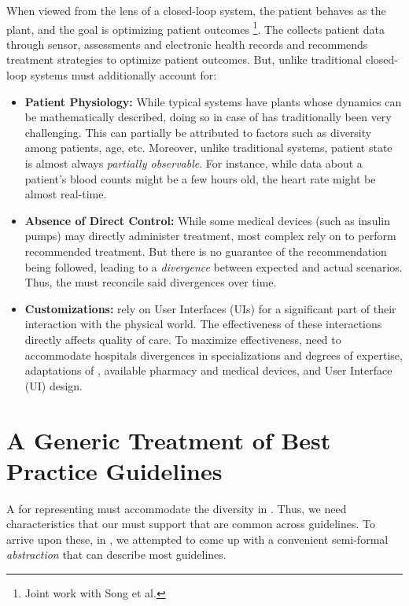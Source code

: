 When viewed from the lens of a closed-loop system, the patient behaves
as the plant, and the goal is optimizing patient outcomes
\cite{SongSMC23}\footnote{Joint work with Song et al.}. The \CDSSs{}
collects patient data through sensor, assessments and electronic
health records and recommends treatment strategies to optimize patient
outcomes. But, unlike traditional closed-loop systems
\CDSSs{} must additionally account for:
\begin{itemize}
  \item \textbf{Patient Physiology:} While typical systems have
  plants whose dynamics can be mathematically described, doing so
  in case of \CDSSs{} has traditionally been very challenging. This
  can partially be attributed to factors such as diversity among patients,
  age, etc. Moreover, unlike traditional systems, patient state is
  almost always \emph{partially observable}. For instance,
  while data about a patient's blood counts might be a few hours old,
  the heart rate might be almost real-time.
  \item \textbf{Absence of Direct Control:} While some medical devices
  (such as insulin pumps) may directly administer treatment, most
  complex \CDSSs{} rely on \HCPs{} to perform recommended treatment.
  But there is no guarantee of the recommendation being followed,
  leading to a \emph{divergence} between expected and actual scenarios.
  Thus, the \CDSS{} must reconcile said divergences over time.
  \item \textbf{Customizations:} \CDSSs{} rely on User Interfaces (UIs) for
  a significant part of their interaction with the physical world.
  The effectiveness of these interactions directly affects quality of care.
  To maximize effectiveness, \CDSSs{} need to accommodate
  hospitals divergences in specializations and
  degrees of expertise, adaptations of \BPGs{}, available pharmacy and medical devices,
  and User Interface (UI) design.
\end{itemize}

\section{A Generic Treatment of Best Practice Guidelines}\label{sec:generic-bpg}

A \DSL{} for representing \BPGs{} must accommodate the diversity
in \BPGs{}. Thus, we need characteristics that our \DSL{} must
support that are common across guidelines. To arrive upon these,
in \cite{SongSMC23}, we attempted
to come up with a convenient semi-formal \emph{abstraction}
that can describe most guidelines.

